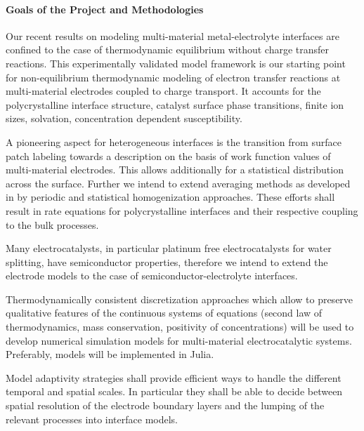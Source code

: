 \documentclass[a4paper,10pt]{article}
\begin{document}
\paragraph{Goals of the Project and Methodologies}
Our recent results on modeling multi-material metal-electrolyte interfaces are confined to the case of thermodynamic equilibrium without charge transfer reactions. This experimentally validated model framework is our starting point for non-equilibrium thermodynamic modeling of electron transfer reactions at multi-material electrodes coupled to charge transport. It accounts for the polycrystalline interface structure, catalyst surface phase transitions, finite ion sizes, solvation, concentration dependent susceptibility.

A pioneering aspect for heterogeneous interfaces is the transition from surface patch labeling towards a description %
on the basis of work function values of multi-material electrodes. This allows additionally for a statistical distribution across the surface. Further we intend to extend averaging methods as developed in \cite{JES}  by periodic and statistical homogenization approaches.
%
These efforts shall result in  rate   equations  for polycrystalline interfaces  and their respective coupling to the bulk processes.

Many electrocatalysts, in particular platinum free electrocatalysts for water splitting, have semiconductor properties, therefore we intend to extend the electrode models to the case of semiconductor-electrolyte interfaces.

Thermodynamically consistent discretization approaches which allow to preserve qualitative features of the continuous systems of equations  (second law of thermodynamics, mass conservation, positivity of concentrations) will be used to  develop numerical simulation models for multi-material electrocatalytic systems.  Preferably, models will be implemented in  Julia.

Model adaptivity strategies shall provide efficient ways to handle the different temporal and spatial scales. %
In particular they shall be able to decide between spatial resolution of the electrode boundary layers and the lumping of the relevant processes into interface models.
\end{document}

